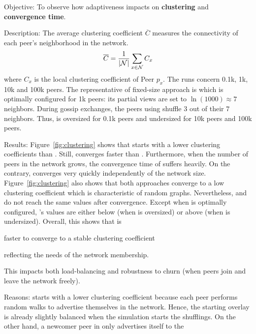\begin{asparadesc}
\item[Objective:] To observe how adaptiveness impacts on \textbf{clustering} and
  \textbf{convergence time}.
\item[Description:] The average clustering coefficient $\overline{C}$ measures
  the connectivity of each peer's neighborhood in the network.
  \begin{equation}
    \overline{C} = {1\over |\mathcal{N}|}\sum\limits_{x\in\mathcal{N}}C_x
  \end{equation}
  where $C_x$ is the local clustering coefficient of Peer $p_x$.  The
  runs concern 0.1k, 1k, 10k and 100k peers. The representative of
  fixed-size approach is \CYCLON which is optimally configured for 1k
  peers: its partial views are set to $\ln(1000)\approx 7$
  neighbors. During gossip exchanges, the peers using \CYCLON shuffle
  $3$ out of their $7$ neighbors. Thus, \CYCLON is oversized for 0.1k
  peers and undersized for 10k peers and 100k peers.
\item[Results:] Figure~\ref{fig:clustering} shows that \CYCLON starts
  with a lower clustering coefficients than \SPRAY. Still, \SPRAY
  converges faster than \CYCLON. Furthermore, when the number of peers
  in the network grows, the convergence time of \CYCLON suffers
  heavily. On the contrary, \SPRAY converges very quickly
  independently of the network size. Figure~\ref{fig:clustering} also
  shows that both approaches converge to a low clustering coefficient
  which is characteristic of random graphs. Nevertheless, \CYCLON and
  \SPRAY do not reach the same values after convergence. Except when
  \CYCLON is optimally configured, \SPRAY's values are either below
  (when \CYCLON is oversized) or above (when \CYCLON is undersized).
  Overall, this shows that \SPRAY is
  \begin{inparaenum}
  \item faster to converge to a stable clustering coefficient
  \item reflecting the needs of the network membership.
  \end{inparaenum}
  This impacts both load-balancing and robustness to churn (when peers
  join and leave the network freely).
\item[Reasons:] \CYCLON starts with a lower clustering coefficient
  because each peer performs random walks to advertise themselves in
  the network. Hence, the starting overlay is already slightly
  balanced when the simulation starts the shufflings. On the other
  hand, a newcomer peer in \SPRAY only advertises itself to the

\end{asparadesc}
